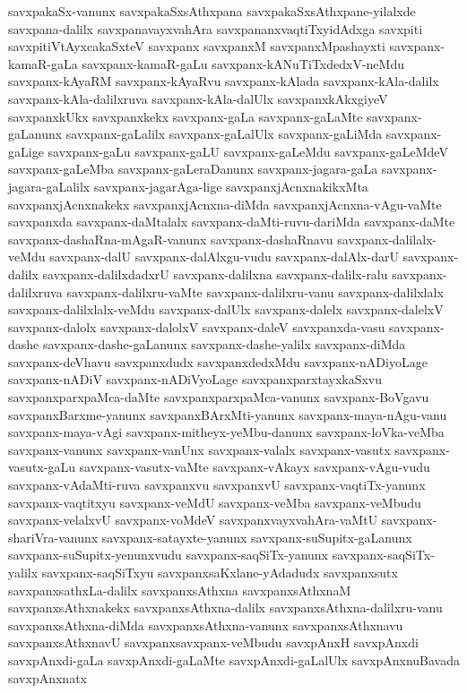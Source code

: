 {savxpakaSx-vanunx
savxpakaSxsAthxpana
savxpakaSxsAthxpane-yilalxde
savxpana-dalilx
savxpanavayxvahAra
savxpananxvaqtiTxyidAdxga
savxpiti
savxpitiVtAyxcakaSxteV
savxpanx
savxpanxM
savxpanxMpashayxti
savxpanx-kamaR-gaLa
savxpanx-kamaR-gaLu
savxpanx-kANuTiTxdedxV-neMdu
savxpanx-kAyaRM
savxpanx-kAyaRvu
savxpanx-kAlada
savxpanx-kAla-dalilx
savxpanx-kAla-dalilxruva
savxpanx-kAla-dalUlx
savxpanxkAkxgiyeV
savxpanxkUkx
savxpanxkekx
savxpanx-gaLa
savxpanx-gaLaMte
savxpanx-gaLanunx
savxpanx-gaLalilx
savxpanx-gaLalUlx
savxpanx-gaLiMda
savxpanx-gaLige
savxpanx-gaLu
savxpanx-gaLU
savxpanx-gaLeMdu
savxpanx-gaLeMdeV
savxpanx-gaLeMba
savxpanx-gaLeraDanunx
savxpanx-jagara-gaLa
savxpanx-jagara-gaLalilx
savxpanx-jagarAga-lige
savxpanxjAcnxnakikxMta
savxpanxjAcnxnakekx
savxpanxjAcnxna-diMda
savxpanxjAcnxna-vAgu-vaMte
savxpanxda
savxpanx-daMtalalx
savxpanx-daMti-ruvu-dariMda
savxpanx-daMte
savxpanx-dashaRna-mAgaR-vanunx
savxpanx-dashaRnavu
savxpanx-dalilalx-veMdu
savxpanx-dalU
savxpanx-dalAlxgu-vudu
savxpanx-dalAlx-darU
savxpanx-dalilx
savxpanx-dalilxdadxrU
savxpanx-dalilxna
savxpanx-dalilx-ralu
savxpanx-dalilxruva
savxpanx-dalilxru-vaMte
savxpanx-dalilxru-vanu
savxpanx-dalilxlalx
savxpanx-dalilxlalx-veMdu
savxpanx-dalUlx
savxpanx-dalelx
savxpanx-dalelxV
savxpanx-dalolx
savxpanx-dalolxV
savxpanx-daleV
savxpanxda-vasu
savxpanx-dashe
savxpanx-dashe-gaLanunx
savxpanx-dashe-yalilx
savxpanx-diMda
savxpanx-deVhavu
savxpanxdudx
savxpanxdedxMdu
savxpanx-nADiyoLage
savxpanx-nADiV
savxpanx-nADiVyoLage
savxpanxparxtayxkaSxvu
savxpanxparxpaMca-daMte
savxpanxparxpaMca-vanunx
savxpanx-BoVgavu
savxpanxBarxme-yanunx
savxpanxBArxMti-yanunx
savxpanx-maya-nAgu-vanu
savxpanx-maya-vAgi
savxpanx-mitheyx-yeMbu-danunx
savxpanx-loVka-veMba
savxpanx-vanunx
savxpanx-vanUnx
savxpanx-valalx
savxpanx-vasutx
savxpanx-vasutx-gaLu
savxpanx-vasutx-vaMte
savxpanx-vAkayx
savxpanx-vAgu-vudu
savxpanx-vAdaMti-ruva
savxpanxvu
savxpanxvU
savxpanx-vaqtiTx-yanunx
savxpanx-vaqtitxyu
savxpanx-veMdU
savxpanx-veMba
savxpanx-veMbudu
savxpanx-velalxvU
savxpanx-voMdeV
savxpanxvayxvahAra-vaMtU
savxpanx-shariVra-vanunx
savxpanx-satayxte-yanunx
savxpanx-suSupitx-gaLanunx
savxpanx-suSupitx-yenunxvudu
savxpanx-saqSiTx-yanunx
savxpanx-saqSiTx-yalilx
savxpanx-saqSiTxyu
savxpanxsaKxlane-yAdadudx
savxpanxsutx
savxpanxsathxLa-dalilx
savxpanxsAthxna
savxpanxsAthxnaM
savxpanxsAthxnakekx
savxpanxsAthxna-dalilx
savxpanxsAthxna-dalilxru-vanu
savxpanxsAthxna-diMda
savxpanxsAthxna-vanunx
savxpanxsAthxnavu
savxpanxsAthxnavU
savxpanxsavxpanx-veMbudu
savxpAnxH
savxpAnxdi
savxpAnxdi-gaLa
savxpAnxdi-gaLaMte
savxpAnxdi-gaLalUlx
savxpAnxnuBavada
savxpAnxnatx
}
